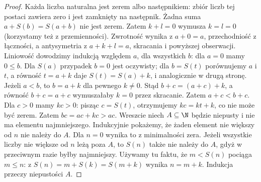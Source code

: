\begin{proof}
Każda liczba naturalna jest zerem albo następnikiem: zbiór liczb tej postaci zawiera zero i jest zamknięty na następnik. Żadna suma $a+S(b)=S(a+b)$ nie jest zerem. Zatem $k+l=0$ wymusza $k=l=0$ (korzystamy też z przemienności). Zwrotność wynika z $a+0=a$, przechodniość z łączności, a antysymetria z $a+k+l=a$, skracania i powyższej obserwacji.
Liniowość dowodzimy indukcją względem $a$, dla wszystkich $b$: dla $a=0$ mamy $0\le b$. Dla $S(a)$ przypadek $b=0$ jest oczywisty; dla $b=S(t)$ porównujemy $a$ i $t$, a równość $t=a+k$ daje $S(t)=S(a)+k$, i analogicznie w drugą stronę.
Jeżeli $a<b$, to $b=a+k$ dla pewnego $k\ne0$. Stąd $b+c=(a+c)+k$, a równość $b+c=a+c$ wymuszałaby $k=0$ przez skracanie. Zatem $a+c<b+c$. Dla $c>0$ mamy $kc>0$: pisząc $c=S(t)$, otrzymujemy $kc=kt+k$, co nie może być zerem. Zatem $bc=ac+kc>ac$.
Wreszcie niech $A\subseteq\N$ będzie niepusty i nie ma elementu najmniejszego. Indukcyjnie pokażemy, że żaden element nie większy od $n$ nie należy do $A$. Dla $n=0$ wynika to z minimalności zera. Jeżeli wszystkie liczby nie większe od $n$ leżą poza $A$, to $S(n)$ także nie należy do $A$, gdyż w przeciwnym razie byłby najmniejszy. Używamy tu faktu, że $m<S(n)$ pociąga $m\le n$: z $S(n)=m+S(k)=S(m+k)$ wynika $n=m+k$. Indukcja przeczy niepustości $A$.
\end{proof}

